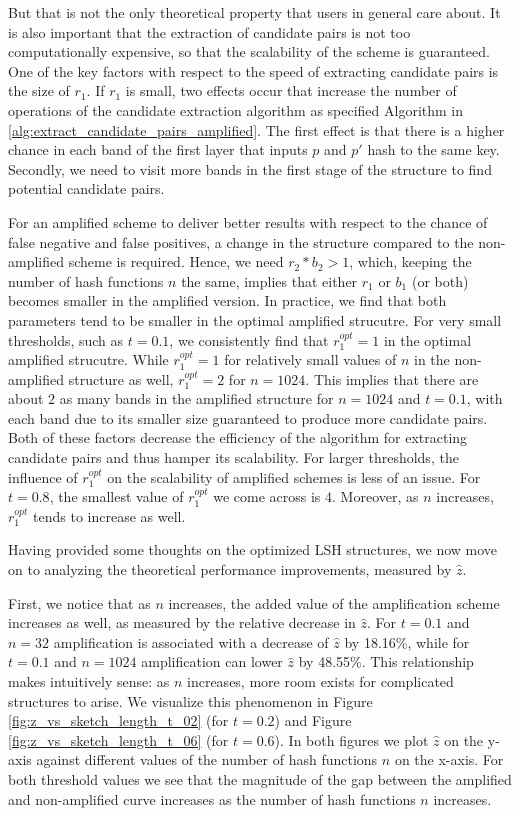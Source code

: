 But that is not the only theoretical property that users in general care about. It is also important that the extraction of candidate pairs is not too computationally expensive, so that the scalability of the scheme is guaranteed. One of the key factors with respect to the speed of extracting candidate pairs is the size of $r_1$. If $r_1$ is small, two effects occur that increase the number of operations of the candidate extraction algorithm as specified Algorithm in \ref{alg:extract_candidate_pairs_amplified}. The first effect is that there is a higher chance in each band of the first layer that inputs $p$ and $p'$ hash to the same key. Secondly, we need to visit more bands in the first stage of the structure to find potential candidate pairs. 

For an amplified scheme to deliver better results with respect to the chance of false negative and false positives, a change in the structure compared to the non-amplified scheme is required. Hence, we need $r_2 * b_2 > 1$, which, keeping the number of hash functions $n$ the same, implies that either $r_1$ or $b_1$ (or both) becomes smaller in the amplified version. In practice, we find that both parameters tend to be smaller in the optimal amplified strucutre. For very small thresholds, such as $t=0.1$, we consistently find that $r_1^{opt} = 1$ in the optimal amplified strucutre. While $r_1^{opt} = 1$ for relatively small values of $n$ in the non-amplified structure as well, $r_1^{opt} = 2$ for $n=1024$. This implies that there are about $2$ as many bands in the amplified structure for $n=1024$ and $t=0.1$, with each band due to its smaller size guaranteed to produce more candidate pairs. Both of these factors decrease the efficiency of the algorithm for extracting candidate pairs and thus hamper its scalability. For larger thresholds, the influence of $r_1^{opt}$ on the scalability of amplified schemes is less of an issue. For $t=0.8$, the smallest value of $r_1^{opt}$ we come across is $4$. Moreover, as $n$ increases, $r_1^{opt}$ tends to increase as well.

Having provided some thoughts on the optimized LSH structures, we now move on to analyzing the theoretical performance improvements, measured by $\hat{z}$. 

First, we notice that as $n$ increases, the added value of the amplification scheme increases as well, as measured by the relative decrease in $\hat{z}$. For $t=0.1$ and $n=32$ amplification is associated with a decrease of $\hat{z}$ by 18.16\%, while for $t=0.1$ and $n=1024$ amplification can lower $\hat{z}$ by 48.55\%. This relationship makes intuitively sense: as $n$ increases, more room exists for complicated structures to arise. We visualize this phenomenon in Figure \ref{fig:z_vs_sketch_length_t_02} (for $t=0.2$) and Figure \ref{fig:z_vs_sketch_length_t_06} (for $t=0.6$). In both figures we plot $\hat{z}$ on the y-axis against different values of the number of hash functions $n$ on the x-axis.  For both threshold values we see that the magnitude of the gap between the amplified and non-amplified curve increases as the number of hash functions $n$ increases. 


